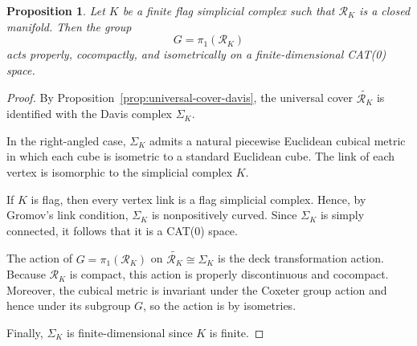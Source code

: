 \documentclass[10pt,a4paper]{amsart}
\newtheorem{prop}{Proposition}
\begin{document}
\begin{prop}
\label{prop:cat0_action}
Let $K$ be a finite flag simplicial complex such that $\mathcal{R}_K$ is a closed manifold. Then the group
\[
G=\pi_1(\mathcal{R}_K)
\]
acts properly, cocompactly, and isometrically on a finite-dimensional CAT(0) space.
\end{prop}

\begin{proof}
By Proposition~\ref{prop:universal-cover-davis}, the universal cover $\widetilde{\mathcal{R}_K}$ is identified with the Davis complex $\Sigma_K$.

In the right-angled case, $\Sigma_K$ admits a natural piecewise Euclidean cubical metric in which each cube is isometric to a standard Euclidean cube. The link of each vertex is isomorphic to the simplicial complex $K$.

If $K$ is flag, then every vertex link is a flag simplicial complex. Hence, by Gromov's link condition, $\Sigma_K$ is nonpositively curved. Since $\Sigma_K$ is simply connected, it follows that it is a CAT(0) space.

The action of $G=\pi_1(\mathcal{R}_K)$ on $\widetilde{\mathcal{R}_K} \cong \Sigma_K$ is the deck transformation action. Because $\mathcal{R}_K$ is compact, this action is properly discontinuous and cocompact. Moreover, the cubical metric is invariant under the Coxeter group action and hence under its subgroup $G$, so the action is by isometries.

Finally, $\Sigma_K$ is finite-dimensional since $K$ is finite.
\end{proof}
\end{document}
